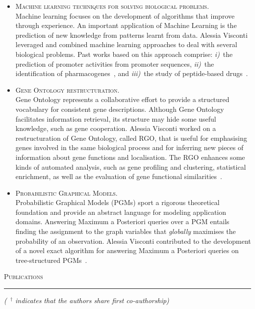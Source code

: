 \documentclass[a4paper,10pt]{article}
\newcommand{\mediumtitle}[1]{
	\vspace{0.2cm}
	{\noindent
	\Large \textsc{#1}\\[-2ex]
	\hrule
	\vspace{0.2cm}}
}
\newcommand{\smalltitle}[1]{
	\vspace{0.1cm}
	{\noindent 
	\large \textsc{#1}}
	\vspace{0.1cm}
}
\newcommand{\bulletitem}{\item[$\bullet$]}
\begin{document}
\begin{itemize}
\bulletitem \smalltitle{Machine learning techniques for solving biological problems.}\\
Machine learning focuses on the development of algorithms that improve through experience. An important application of Machine Learning  is the prediction of new knowledge from patterns learnt from data. 
Alessia Visconti leveraged and combined machine learning approaches to deal with several biological problems. Past works based on this approach comprise: \emph{i)}~the prediction of promoter activities from promoter sequences, \emph{ii)}~the identification of pharmacogenes~\cite{Vis12a, Vis12b}, and \emph{iii)}~the study of peptide-based drugs~\cite{Erm14, Vis15a, Erm13a}.

\bulletitem \smalltitle{Gene Ontology restructuration.} \\
Gene Ontology represents a collaborative effort to provide a structured vocabulary for consistent gene descriptions. Although Gene Ontology facilitates information retrieval, its structure may hide some useful knowledge, such as gene cooperation.
Alessia Visconti worked on a restructuration of Gene Ontology, called RGO, that is useful for emphasising genes involved in the same biological process and for inferring new pieces of information about gene functions and localisation. The RGO enhances some kinds of automated analysis, such as gene profiling and clustering, statistical enrichment, as well as the evaluation of gene functional similarities~\cite{Vis11a, Vis10a, Vis12b}.

\bulletitem \smalltitle{Probabilistic Graphical Models.}\\
Probabilistic Graphical Models (PGMs) sport a rigorous theoretical foundation and provide an abstract language for modeling application domains. Answering Maximum a Posteriori queries over a PGM entails finding the assignment to the graph variables that \emph{globally} maximises the probability of an observation. 
Alessia Visconti contributed to the development of a novel exact algorithm for answering Maximum a Posteriori queries on tree-structured PGMs~\cite{Esp13}.

\end{itemize}


\newpage


\mediumtitle{Publications}

{\footnotesize \noindent \emph{(~$^{\textbf{$\dag $}}$ indicates that the authors share first co-authorship)}}
\end{document}
